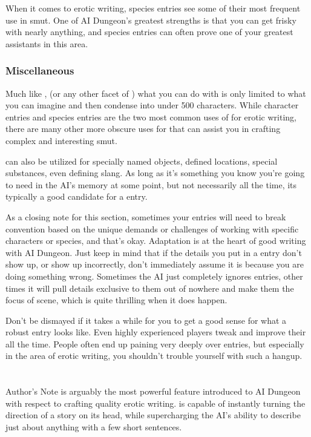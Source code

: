 ﻿\documentclass[Coomer-main.tex]{subfiles}
\begin{document}
When it comes to erotic writing, species entries see some of their most frequent use in smut. One of AI Dungeon's greatest strengths is that you can get frisky with nearly anything, and species entries can often prove one of your greatest assistants in this area.

\subsection{Miscellaneous}

Much like \an, (or any other facet of \aid) what you can do with \wi is only limited to what you can imagine and then condense into under 500 characters. While character entries and species entries are the two most common uses of \wi for erotic writing, there are many other more obscure uses for \wi that can assist you in crafting complex and interesting smut.

\wi can also be utilized for specially named objects, defined locations, special substances, even defining slang. As long as it's something you know you're going to need in the AI's memory at some point, but not necessarily all the time, its typically a good candidate for a \wi entry.

As a closing note for this section, sometimes your \wi entries will need to break convention based on the unique demands or challenges of working with specific characters or species, and that's okay. Adaptation is at the heart of good writing with AI Dungeon. Just keep in mind that if the details you put in a \wi entry don't show up, or show up incorrectly, don't immediately assume it is because you are doing something wrong. Sometimes the AI just completely ignores entries, other times it will pull details exclusive to them out of nowhere and make them the focus of scene, which is quite thrilling when it does happen.

Don't be dismayed if it takes a while for you to get a good sense for what a robust \wi entry looks like. Even highly experienced players tweak and improve their \wi all the time. People often end up paining very deeply over \wi entries, but especially in the area of erotic writing, you shouldn't trouble yourself with such a hangup.

\chapter{\ans}

Author's Note is arguably the most powerful feature introduced to AI Dungeon with respect to crafting quality erotic writing. \an is capable of instantly turning the direction of a story on its head, while supercharging the AI's ability to describe just about anything with a few short sentences.
\end{document}
